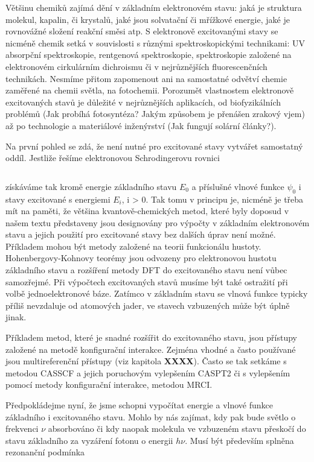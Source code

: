 Většinu chemiků zajímá dění v základním elektronovém stavu: jaká je struktura molekul, kapalin, či krystalů, jaké jsou solvatační či mřížkové energie, jaké je rovnovážné složení reakční směsi atp. S elektronově excitovanými stavy se nicméně chemik setká v  souvislosti s různými spektroskopickými technikami: UV absorpční spektroskopie, rentgenová spektroskopie, spektroskopie založené na elektronovém cirkulárním dichroismu či v nejrůznějších fluorescenčních technikách. Nesmíme přitom zapomenout ani na samostatné odvětví chemie zaměřené na chemii světla, na fotochemii. Porozumět vlastnostem elektronově excitovaných stavů je důležité v nejrůznějších aplikacích, od biofyzikálních problémů (Jak probíhá fotosyntéza? Jakým  způsobem je přenášen zrakový vjem) až po technologie a materiálové inženýrství (Jak fungují solární články?). 

Na první pohled se zdá, že není nutné pro excitované stavy vytvářet samostatný oddíl. Jestliže řešíme elektronovou Schrodingerovu rovnici

\begin{equation}
\label{rov:XXX}
\end{equation}

\noindent získáváme tak kromě energie základního stavu $E_0$ a příslušné vlnové funkce $\psi_0$ i stavy excitované s energiemi $E_i$, i > 0. Tak tomu v principu je, nicméně je třeba mít na paměti, že většina kvantově-chemických metod, které byly doposud v našem textu představeny jsou designovány pro výpočty v základním elektronovém stavu a jejich použití pro excitované stavy bez dalších úprav není možné. Příkladem mohou být metody založené na teorii funkcionálu hustoty. Hohenbergovy-Kohnovy teorémy jsou odvozeny pro elektronovou hustotu základního stavu a rozšíření metody DFT do excitovaného stavu není vůbec samozřejmé. Při výpočtech excitovaných stavů musíme být také ostražití při volbě jednoelektronové báze. Zatímco v základním stavu se vlnová funkce typicky příliš nevzdaluje od atomových jader, ve stavech vzbuzených může být úplně jinak.  

Příkladem metod, které je snadné rozšířit do excitovaného stavu, jsou přístupy založené na metodě konfigurační interakce. Zejména vhodné a často používané jsou multireferenční přístupy (viz kapitola \textbf{XXXX}). Často se tak setkáme s metodou CASSCF a jejich poruchovým  vylepšením CASPT2 či s vylepšením pomocí metody konfigurační interakce, metodou MRCI.   

Předpokládejme nyní, že jsme schopni vypočítat energie a vlnové funkce základního i excitovaného stavu. Mohlo by nás zajímat, kdy pak bude světlo o frekvenci $\nu$ absorbováno či kdy naopak molekula ve vzbuzeném stavu přeskočí do stavu základního za vyzáření fotonu o energii $h\nu$. Musí být především splněna rezonanční podmínka 


